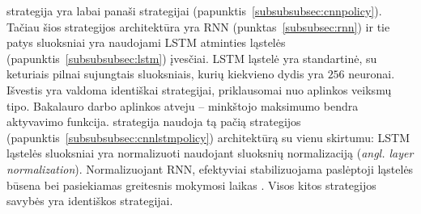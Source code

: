 \documentclass{VUMIFPSbakalaurinis}
\begin{document}
\label{subsubsubsec:cnnlstmpolicy}
{
	 strategija yra labai panaši  strategijai (papunktis~\ref{subsubsubsec:cnnpolicy}). Tačiau šios strategijos architektūra yra RNN (punktas~\ref{subsubsec:rnn}) ir tie patys  sluoksniai yra naudojami LSTM atminties ląstelės (papunktis~\ref{subsubsubsec:lstm}) įvesčiai. LSTM ląstelė yra standartinė, su keturiais pilnai sujungtais sluoksniais, kurių kiekvieno dydis yra \(256\) neuronai. Išvestis yra valdoma identiškai  strategijai, priklausomai nuo aplinkos veiksmų tipo. Bakalauro darbo aplinkos atveju -- minkštojo maksimumo bendra aktyvavimo funkcija. 
}
\label{subsubsubsec:cnnlnlstmpolicy}
{
	 strategija naudoja tą pačią  strategijos (papunktis~\ref{subsubsubsec:cnnlstmpolicy}) architektūrą su vienu skirtumu: LSTM ląstelės sluoksniai yra normalizuoti naudojant sluoksnių normalizaciją (\textit{angl. layer normalization}). Normalizuojant RNN, efektyviai stabilizuojama paslėptoji ląstelės būsena bei pasiekiamas greitesnis mokymosi laikas \cite{ba2016layer}. Visos kitos strategijos savybės yra identiškos  strategijai.
}
\end{document}
